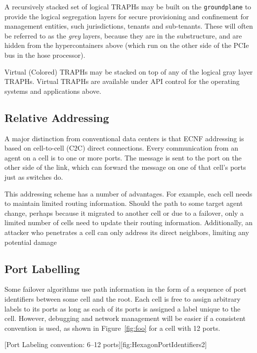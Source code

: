 \documentclass[../../../OAE-SPEC-MAIN.tex]{subfiles}
\begin{document}
A recursively stacked set of logical TRAPHs may be built on the \texttt{groundplane} to provide the logical segregation layers for secure provisioning and confinement for management entities, such jurisdictions, tenants and sub-tenants. These will often be referred to as the \emph{grey} layers, because they are in the substructure, and are hidden from the  hypercontainers above (which run on the other side of the PCIe bus in the hose processor).

Virtual (Colored) TRAPHs may be stacked on top of any of the logical gray layer TRAPHs.  Virtual TRAPHs are available under API control for the operating systems and applications above.



\subsection{Relative Addressing}

A major distinction from conventional data centers is that ECNF addressing is based on cell-to-cell (C2C) direct connections. Every communication from an agent on a cell is to one or more ports. The message is sent to the port on the other side of the link, which can forward the message on one of that cell's ports just as switches do. 

This addressing scheme has a number of advantages.  For example, each cell needs to maintain limited routing information.  Should the path to some target agent change, perhaps because it migrated to another cell or due to a failover, only a limited number of cells need to update their routing information.  Additionally, an attacker who penetrates a cell can only address its direct neighbors, limiting any potential damage

\subsection{Port Labelling} 

Some failover algorithms use path information in the form of a sequence of port identifiers between some cell and the root.  Each cell is free to assign arbitrary labels to its ports as long as each of its ports is assigned a label unique to the cell.  However, debugging and network management will be easier if a consistent convention is used, as shown in Figure~\ref{fig:foo} for a cell with 12 ports.
 
[Port Labeling convention: 6--12 ports][fig:HexagonPortIdentifiers2]
 
\end{document}
